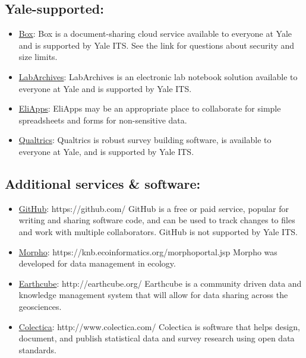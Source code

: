 \documentclass{tufte-handout}
\begin{document}
\subsection{Yale-supported:}\label{yale-supported}

\begin{itemize}
\item
  \href{http://its.yale.edu/services/collaboration-and-file-sharing/box-yale}{Box}:
  Box is a document-sharing cloud service available to everyone at Yale
  and is supported by Yale ITS. See the link for questions about
  security and size limits.
\item
  \href{http://its.yale.edu/services/research-technologies/elab-notebook/labarchives-faqs}{LabArchives}:
  LabArchives is an electronic lab notebook solution available to
  everyone at Yale and is supported by Yale ITS.
\item
  \href{http://its.yale.edu/services/email-and-calendars/eliapps-google-apps-education}{EliApps}:
  EliApps may be an appropriate place to collaborate for simple
  spreadsheets and forms for non-sensitive data.
\item
  \href{http://its.yale.edu/services/web-and-application-services/qualtrics-survey-tool}{Qualtrics}:
  Qualtrics is robust survey building software, is available to everyone
  at Yale, and is supported by Yale ITS.
\end{itemize}

\subsection{Additional services \&
software:}\label{additional-services-software}

\begin{itemize}
\item
  \href{https://github.com/}{GitHub}: https://github.com/ GitHub is a
  free or paid service, popular for writing and sharing software code,
  and can be used to track changes to files and work with multiple
  collaborators. GitHub is not supported by Yale ITS.
\item
  \href{https://knb.ecoinformatics.org/morphoportal.jsp}{Morpho}:
  https://knb.ecoinformatics.org/morphoportal.jsp Morpho was developed
  for data management in ecology.
\item
  \href{http://earthcube.org/}{Earthcube}: http://earthcube.org/
  Earthcube is a community driven data and knowledge management system
  that will allow for data sharing across the geosciences.
\item
  \href{http://www.colectica.com/}{Colectica}: http://www.colectica.com/
  Colectica is software that helps design, document, and publish
  statistical data and survey research using open data standards.
\end{itemize}
\end{document}
